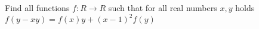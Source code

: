 Find all functions $f: R \to  R$ such that for all real numbers $x, y$ holds $f(y - xy) = f(x)y + (x - 1)^2 f(y)$